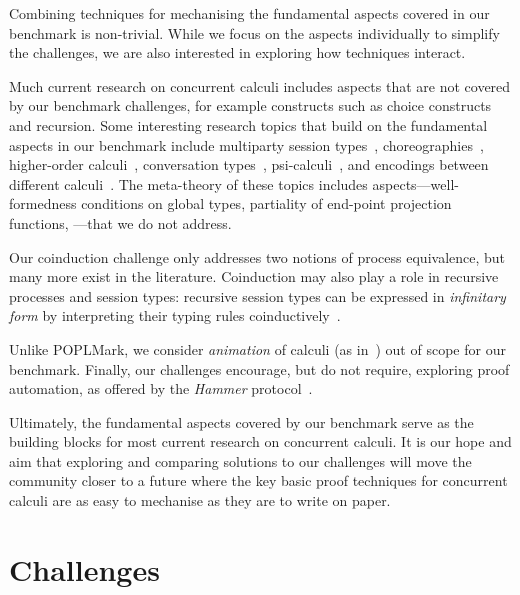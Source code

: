 \documentclass[runningheads]{llncs}
\begin{document}
Combining techniques for mechanising the fundamental aspects covered in our benchmark is non-trivial.
While we focus on the aspects individually to simplify the challenges, we are also interested in exploring how techniques interact.

Much current research on concurrent calculi includes aspects that are
not covered by our benchmark challenges, for example constructs such as
choice constructs and recursion.
Some interesting research topics that build on the
fundamental aspects in our benchmark include multiparty session
types~\cite{10.1145/2827695}, choreographies~\cite{Carbone2013},
higher-order calculi~\cite{Hirsch2022}, conversation
types~\cite{DBLP:journals/tcs/CairesV10}, psi-calculi~\cite{lmcs:696},
and encodings between different
calculi~\cite{DBLP:journals/iandc/Gorla10,DBLP:journals/iandc/DardhaGS17}.
The meta-theory of these topics includes aspects---\eg well-formedness conditions on
global types, partiality of end-point projection functions,
\etc---that we do not address.

Our coinduction challenge only addresses two notions of process equivalence, but many more exist in the literature.
Coinduction may also play a role in recursive processes and session types: recursive session types can be expressed in \emph{infinitary form} by interpreting their typing rules coinductively~\cite{DerakhshanPfenning22,HornePadovani23}.

Unlike POPLMark, we consider \emph{animation} of calculi (as in~\cite{Castro-Perez2021}) out of scope for our benchmark.
Finally, our challenges encourage, but do not require, exploring proof automation, as offered by \eg the \emph{Hammer} protocol~\cite{BohmeN10,CzajkaK18}.

Ultimately, the fundamental aspects covered by our benchmark serve as the building blocks for most current research on concurrent calculi.
It is our hope and aim that exploring and comparing solutions to our challenges will move the community closer to a future where the key basic proof techniques for concurrent calculi are as easy to mechanise as they are to write on paper.




\clearpage
\appendix
\section{Challenges}\label{app:challenges}

\end{document}
